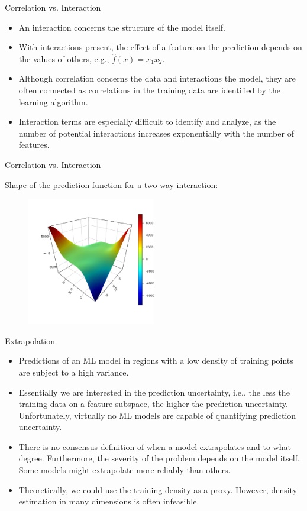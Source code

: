 \documentclass[11pt,compress,t,notes=noshow, aspectratio=169, xcolor=table]{beamer}
\begin{document}
\begin{frame}{Correlation vs. Interaction}
\begin{itemize}
\item An interaction concerns the structure of the model itself.
\item With interactions present, the effect of a feature on the prediction depends on the values of others, e.g., $\widehat{f}(x) = x_1 x_2$.
\item Although correlation concerns the data and interactions the model, they are often connected as correlations in the training data are identified by the learning algorithm.
\item Interaction terms are especially difficult to identify and analyze, as the number of potential interactions increases exponentially with the number of features.
\end{itemize}
\end{frame}

\begin{frame}{Correlation vs. Interaction}

Shape of the prediction function for a two-way interaction:

\begin{figure}
\includegraphics[width = 0.5\textwidth]{figure/interaction}
\end{figure}
\end{frame}


\begin{frame}{Extrapolation}
\begin{itemize}
\item Predictions of an ML model in regions with a low density of training points are subject to a high variance.
\item Essentially we are interested in the prediction uncertainty, i.e., the less the training data on a feature subspace, the higher the prediction uncertainty. Unfortunately, virtually no ML models are capable of quantifying prediction uncertainty.
\item There is no consensus definition of when a model extrapolates and to what degree. Furthermore, the severity of the problem depends on the model itself. Some models might extrapolate more reliably than others.
\item Theoretically, we could use the training density as a proxy. However, density estimation in many dimensions is often infeasible.
\end{itemize}

\end{frame}
\end{document}
